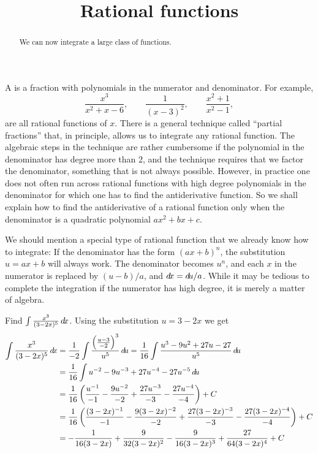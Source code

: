 \documentclass{ximera}
\title[Dig-In:]{Rational functions}
\begin{document}
\begin{abstract}
We can now integrate a large class of functions.  
\end{abstract}
\maketitle

A  is a fraction with polynomials in the
numerator and denominator.  For example,
\[
  \frac{x^3}{x^2+x-6},
  \qquad
  \frac{1}{(x-3)^2},
  \qquad
  \frac{x^2+1}{x^2-1},
\] 
are all rational functions of $x$.  There is a general technique
called ``partial fractions'' that, in
principle, allows us to integrate any rational function.  The
algebraic steps in the technique are rather cumbersome if the
polynomial in the denominator has degree more than 2, and the
technique requires that we factor the denominator, something that is
not always possible.  However, in practice one does not often run
across rational functions with high degree polynomials in the
denominator for which one has to find the antiderivative function.  So
we shall explain how to find the antiderivative of a rational function
only when the denominator is a quadratic polynomial $ax^2+bx+c$.

We should mention a special type of rational function that we already
know how to integrate: If the denominator has the form $(ax+b)^n$,
the substitution $u=ax+b$ will always work.  The denominator becomes
$u^n$, and each $x$ in the numerator is replaced by $(u-b)/a$, and
$\mathop{}\!d\! x=\mathop{}\!d\! u/a$. While it may be tedious to complete the integration if the
numerator has high degree, it is merely a matter of algebra.

\begin{example}
Find $\int\frac{x^3}{(3-2x)^5}\mathop{}\!d\! x$. Using the substitution 
$u=3-2x$ we get
\begin{align*}
  \int\frac{x^3}{(3-2x)^5}\d x
  &=\frac{1}{-2}\int \frac{\left(\frac{u-3}{-2}\right)^3}{u^5}\d u
  =\frac{1}{16}\int \frac{u^3-9u^2+27u-27}{u^5}\d u \\
  &=\frac{1}{16}\int u^{-2}-9u^{-3}+27u^{-4}-27u^{-5}\d u \\
  &=\frac{1}{16}\left(\frac{u^{-1}}{-1}-\frac{9u^{-2}}{-2}+\frac{27u^{-3}}{-3}
  -\frac{27u^{-4}}{-4}\right)+C \\
  &=\frac{1}{16}\left(\frac{(3-2x)^{-1}}{-1}-\frac{9(3-2x)^{-2}}{-2}+
  \frac{27(3-2x)^{-3}}{-3}
  -\frac{27(3-2x)^{-4}}{-4}\right)+C \\
  &=-\frac{1}{16(3-2x)}+\frac{9}{32(3-2x)^2}-\frac{9}{16(3-2x)^3}+\frac{27}{64(3-2x)^4}+C
\end{align*}
\end{example}
\end{document}
